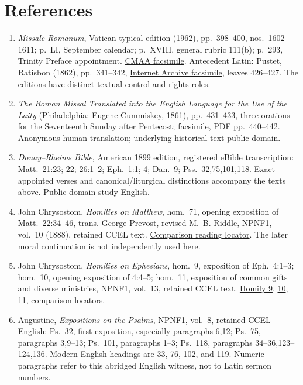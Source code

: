 \section*{References}
\begin{enumerate}
\item \textit{Missale Romanum}, Vatican typical edition (1962), pp.~398--400, nos.~1602--1611; p.~LI, September calendar; p.~XVIII, general rubric 111(b); p.~293, Trinity Preface appointment. \href{https://media.churchmusicassociation.org/pdf/missale62.pdf}{CMAA facsimile}. Antecedent Latin: Pustet, Ratisbon (1862), pp.~341--342, \href{https://archive.org/details/bub_gb_E7sPAAAAIAAJ}{Internet Archive facsimile}, leaves 426--427. The editions have distinct textual-control and rights roles.
\item \textit{The Roman Missal Translated into the English Language for the Use of the Laity} (Philadelphia: Eugene Cummiskey, 1861), pp.~431--433, three orations for the Seventeenth Sunday after Pentecost; \href{https://archive.org/details/romanmissaltran00churgoog}{facsimile}, PDF pp.~440--442. Anonymous human translation; underlying historical text public domain.
\item \textit{Douay--Rheims Bible}, American 1899 edition, registered eBible transcription: Matt.~21:23; 22; 26:1--2; Eph.~1:1; 4; Dan.~9; Pss.~32,75,101,118. Exact appointed verses and canonical/liturgical distinctions accompany the texts above. Public-domain study English.
\item John Chrysostom, \textit{Homilies on Matthew}, hom.~71, opening exposition of Matt.~22:34--46, trans. George Prevost, revised M.~B. Riddle, NPNF1, vol.~10 (1888), retained CCEL text. \href{https://www.newadvent.org/fathers/200171.htm}{Comparison reading locator}. The later moral continuation is not independently used here.
\item John Chrysostom, \textit{Homilies on Ephesians}, hom.~9, exposition of Eph.~4:1--3; hom.~10, opening exposition of 4:4--5; hom.~11, exposition of common gifts and diverse ministries, NPNF1, vol.~13, retained CCEL text. \href{https://www.newadvent.org/fathers/230109.htm}{Homily 9}, \href{https://www.newadvent.org/fathers/230110.htm}{10}, \href{https://www.newadvent.org/fathers/230111.htm}{11}, comparison locators.
\item Augustine, \textit{Expositions on the Psalms}, NPNF1, vol.~8, retained CCEL English: Ps.~32, first exposition, especially paragraphs 6,12; Ps.~75, paragraphs 3,9--13; Ps.~101, paragraphs 1--3; Ps.~118, paragraphs 34--36,123--124,136. Modern English headings are \href{https://www.newadvent.org/fathers/1801033.htm}{33}, \href{https://www.newadvent.org/fathers/1801076.htm}{76}, \href{https://www.newadvent.org/fathers/1801102.htm}{102}, and \href{https://www.newadvent.org/fathers/1801119.htm}{119}. Numeric paragraphs refer to this abridged English witness, not to Latin sermon numbers.

\end{enumerate}
